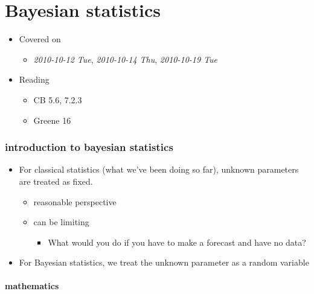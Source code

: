 
\part{Bayesian statistics}

\begin{itemize}
\item Covered on
\begin{itemize}
\item \textit{2010-10-12 Tue}, \textit{2010-10-14 Thu}, \textit{2010-10-19 Tue}
\end{itemize}
\item Reading
\begin{itemize}
\item CB 5.6, 7.2.3
\item Greene 16
\end{itemize}
\end{itemize}
\section{introduction to bayesian statistics}
\label{sec-1}

\begin{itemize}
\item For classical statistics (what we've been doing so far), unknown parameters are treated as fixed.
\begin{itemize}
\item reasonable perspective
\item can be limiting
\begin{itemize}
\item What would you do if you have to make a forecast and have no data?
\end{itemize}
\end{itemize}
\item For Bayesian statistics, we treat the unknown parameter as a
      random variable
\end{itemize}
\subsection{mathematics}
\label{sec-1-1}

